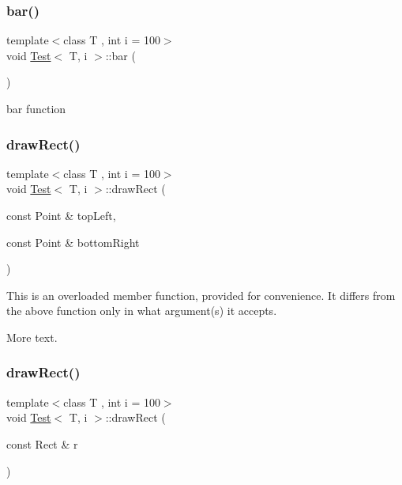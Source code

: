 \subsubsection{\texorpdfstring{bar()}{bar()}}
{\footnotesize\ttfamily template$<$class T , int i = 100$>$ \\
void \mbox{\hyperlink{class_test}{Test}}$<$ T, i $>$\+::bar (\begin{DoxyParamCaption}{ }\end{DoxyParamCaption})}

bar function \mbox{\label{class_test_a78e721f2e24a135158b9bd4c256d537e}} 
\subsubsection{\texorpdfstring{drawRect()}{drawRect()}\hspace{0.1cm}{\footnotesize\ttfamily [1/3]}}
{\footnotesize\ttfamily template$<$class T , int i = 100$>$ \\
void \mbox{\hyperlink{class_test}{Test}}$<$ T, i $>$\+::draw\+Rect (\begin{DoxyParamCaption}\item[{const Point \&}]{top\+Left,  }\item[{const Point \&}]{bottom\+Right }\end{DoxyParamCaption})}

This is an overloaded member function, provided for convenience. It differs from the above function only in what argument(s) it accepts.

More text. \mbox{\label{class_test_aadf47113ad9dcd5600cb22e3bcff5258}} 
\subsubsection{\texorpdfstring{drawRect()}{drawRect()}\hspace{0.1cm}{\footnotesize\ttfamily [2/3]}}
{\footnotesize\ttfamily template$<$class T , int i = 100$>$ \\
void \mbox{\hyperlink{class_test}{Test}}$<$ T, i $>$\+::draw\+Rect (\begin{DoxyParamCaption}\item[{const Rect \&}]{r }\end{DoxyParamCaption})}

